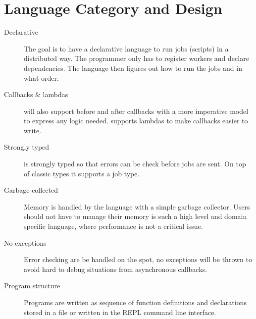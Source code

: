 \section{Language Category and Design}
\label{sect:desg}
\begin{description}
\item[Declarative] The goal is to have a declarative language to run jobs
(scripts) in a distributed way. The programmer only has to register workers and
declare dependencies. The language then figures out how to run the jobs and in
what order.
\item[Callbacks \& lambdas] \lang{} will also support before and after callbacks
with a more imperative model to express any logic needed. \lang{} supports
lambdas to make callbacks easier to write.
\item[Strongly typed] \lang{} is strongly typed so that errors can be check
before jobs are sent. On top of classic types it supports a job type.
\item[Garbage collected] Memory is handled by the language with a simple
garbage collector. Users should not have to manage their memory is such a high
level and domain specific language, where performance is not a critical issue.
\item[No exceptions] Error checking are be handled on the spot, no exceptions
will be thrown to avoid hard to debug situations from asynchronous callbacks.
\item[Program structure] Programs are written as sequence of function
definitions and declarations stored in a file or written in the REPL command line
interface.
\end{description}
